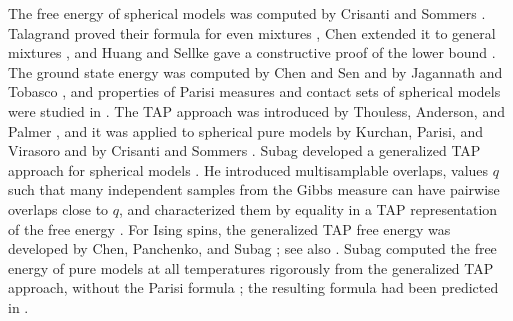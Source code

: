 The free energy of spherical models was computed by Crisanti and Sommers \cite{CrisantiSommers1992}. Talagrand proved their formula for even mixtures \cite{Talagrand2006}, Chen extended it to general mixtures \cite{Chen2013}, and Huang and Sellke gave a constructive proof of the lower bound \cite{HuangSellke2024}. The ground state energy was computed by Chen and Sen \cite{ChenSen2017} and by Jagannath and Tobasco \cite{JagannathTobasco2017low}, and properties of Parisi measures and contact sets of spherical models were studied in \cite{AuffingerChen2015,JagannathTobasco2018contacts,AuffingerChen2018}. The TAP approach was introduced by Thouless, Anderson, and Palmer \cite{ThoulessAndersonPalmer1977}, and it was applied to spherical pure models by Kurchan, Parisi, and Virasoro \cite{KurchanParisiVirasoro1993} and by Crisanti and Sommers \cite{CrisantiSommers1995TAP}. Subag developed a generalized TAP approach for spherical models \cite{Subag2024}. He introduced multisamplable overlaps, values $q$ such that many independent samples from the Gibbs measure can have pairwise overlaps close to $q$, and characterized them by equality in a TAP representation of the free energy \cite[Theorem~5]{Subag2024}. For Ising spins, the generalized TAP free energy was developed by Chen, Panchenko, and Subag \cite{ChenPanchenkoSubag2023,ChenPanchenkoSubag2021}; see also \cite{ChenPanchenko2018}. Subag computed the free energy of pure models at all temperatures rigorously from the generalized TAP approach, without the Parisi formula \cite{Subag2023pure}; the resulting formula had been predicted in \cite{KurchanParisiVirasoro1993,CrisantiSommers1995TAP}.

